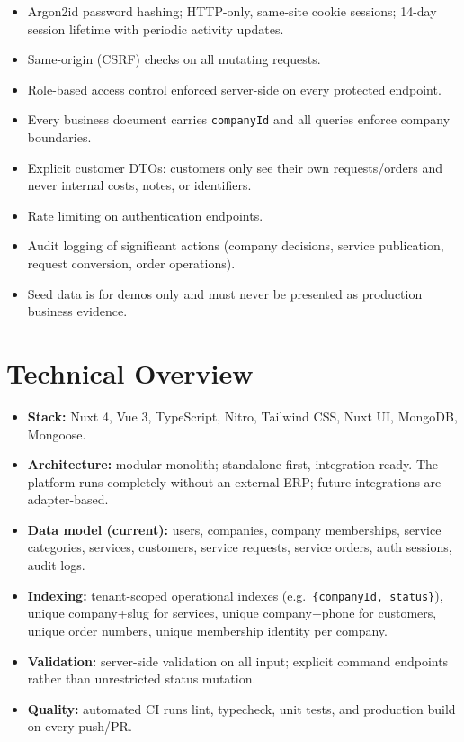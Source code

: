 \documentclass[11pt,a4paper]{article}
\begin{document}
\begin{itemize}[leftmargin=2em, itemsep=2pt]
  \item Argon2id password hashing; HTTP-only, same-site cookie sessions; 14-day session lifetime with periodic activity updates.
  \item Same-origin (CSRF) checks on all mutating requests.
  \item Role-based access control enforced server-side on every protected endpoint.
  \item Every business document carries \texttt{companyId} and all queries enforce company boundaries.
  \item Explicit customer DTOs: customers only see their own requests/orders and never internal costs, notes, or identifiers.
  \item Rate limiting on authentication endpoints.
  \item Audit logging of significant actions (company decisions, service publication, request conversion, order operations).
  \item Seed data is for demos only and must never be presented as production business evidence.
\end{itemize}

\section{Technical Overview}
\label{sec:technical}

\begin{itemize}[leftmargin=2em, itemsep=2pt]
  \item \textbf{Stack:} Nuxt 4, Vue 3, TypeScript, Nitro, Tailwind CSS, Nuxt UI, MongoDB, Mongoose.
  \item \textbf{Architecture:} modular monolith; standalone-first, integration-ready. The platform runs completely without an external ERP; future integrations are adapter-based.
  \item \textbf{Data model (current):} users, companies, company memberships, service categories, services, customers, service requests, service orders, auth sessions, audit logs.
  \item \textbf{Indexing:} tenant-scoped operational indexes (e.g.\ \texttt{\{companyId, status\}}), unique company+slug for services, unique company+phone for customers, unique order numbers, unique membership identity per company.
  \item \textbf{Validation:} server-side validation on all input; explicit command endpoints rather than unrestricted status mutation.
  \item \textbf{Quality:} automated CI runs lint, typecheck, unit tests, and production build on every push/PR.
\end{itemize}
\end{document}
